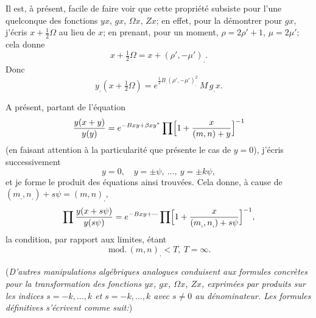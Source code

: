 \documentclass[11pt,a4paper]{article}
\providecommand{\md}{\,\mathrm{mod.}\,}
\begin{document}
\medskip

Il est, \`a pr\'esent, facile de faire voir que cette propri\'et\'e subsiste pour l'une quelconque des fonctions $yx$, $gx$, $\Omega x$, $Zx$; en effet, pour la d\'emontrer pour $gx$, j'\'ecris $x + \tfrac{1}{2}\Omega$ au lieu de $x$; en prenant, pour un moment, $\rho = 2\rho' + 1$, $\mu = 2\mu'$; cela donne
\[
x + \tfrac{1}{2}\Omega = x + (\rho', -\mu')_{,}.
\]
Donc
\[
y_{,}(x + \tfrac{1}{2}\Omega) = e^{\frac{1}{2} B_{,}(\rho', -\mu')_{,}^{2}}\, M\, g_{,} x.
\]

\medskip

A pr\'esent, partant de l'\'equation
\[
\frac{y(x + y)}{y(y)} = e^{-Bxy + \beta x y^*}\prod\Bigl[1 + \frac{x}{(m, n) + y}\Bigr]^{-1}
\]
(en faisant attention \`a la particularit\'e que pr\'esente le cas de $y = 0$), j'\'ecris successivement
\[ y = 0,\quad y = \pm \psi,\ \ldots,\ y = \pm k\psi, \]
et je forme le produit des \'equations ainsi trouv\'ees. Cela donne, \`a cause de $(m_{,}, n_{,}) + s\psi = (m, n)_{,}$,
\[
\prod \frac{y(x + s\psi)}{y(s\psi)} = e^{-Bxy + \cdots} \prod\Bigl[1 + \frac{x}{(m_{,}, n_{,}) + s\psi}\Bigr]^{-1},
\]
la condition, par rapport aux limites, \'etant
\[ \md(m, n)_{,} < T,\ T = \infty. \]

\medskip

\noindent (\emph{D'autres manipulations alg\'ebriques analogues conduisent aux formules concr\`etes pour la transformation des fonctions $yx$, $gx$, $\Omega x$, $Zx$, exprim\'ees par produits sur les indices $s = -k, \ldots, k$ et $s = -k, \ldots, k$ avec $s \neq 0$ au d\'enominateur. Les formules d\'efinitives s'\'ecrivent comme suit:})

\medskip
\end{document}
